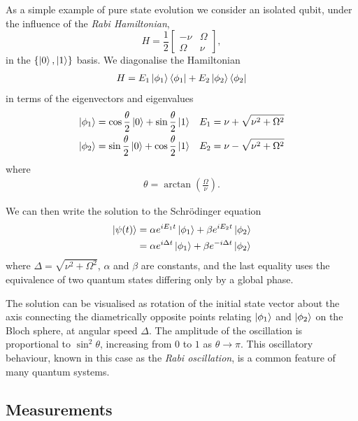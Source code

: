 As a simple example of pure state evolution we consider an isolated qubit, under the influence of the \textit{Rabi Hamiltonian},
\begin{equation} \label{rabi_hamiltonian}
  H = \frac{1}{2}
\begin{bmatrix}
  -\nu & \Omega \\
  \Omega & \nu 
\end{bmatrix},
\end{equation}
in the $\{\left\vert0\right\rangle, \left\vert1\right\rangle\}$ basis. We diagonalise the Hamiltonian
\begin{align}
  H = E_1 \left\vert\phi_1\right\rangle\left\langle \phi_1\right\vert + E_2 \left\vert\phi_2\right\rangle\left\langle \phi_2\right\vert
\end{align}
in terms of the eigenvectors and eigenvalues
\begin{align}
  \left\vert\phi_1\right\rangle &=  \cos\frac{\theta}{2}\left\vert0\right\rangle + \sin\frac{\theta}{2}\left\vert1\right\rangle  &E_1 = \nu + \sqrt{\nu^2 + \Omega^2} \\
  \left\vert\phi_2\right\rangle &=  \sin\frac{\theta}{2}\left\vert0\right\rangle + \cos\frac{\theta}{2}\left\vert1\right\rangle &E_2 = \nu - \sqrt{\nu^2 + \Omega^2} 
\end{align}
where
\begin{align}
  \theta = \arctan\left(\frac{\Omega}{\nu}\right).
\end{align}

We can then write the solution to the Schr\"odinger equation
\begin{align}
  \left\vert\psi(t)\right\rangle &= \alpha e^{iE_1t}\left\vert\phi_1\right\rangle +  \beta e^{iE_2t} \left\vert\phi_2\right\rangle \\
  &= \alpha e^{i\Delta t}\left\vert\phi_1\right\rangle +  \beta e^{- i\Delta t} \left\vert\phi_2\right\rangle 
\end{align}
where $\Delta = \sqrt{\nu^2 + \Omega^2}$, $\alpha$ and $\beta$ are constants, and the last equality uses the equivalence of two quantum states differing only by a global phase. 

The solution can be visualised as rotation of the initial state vector about the axis connecting the diametrically opposite points relating $\left\vert\phi_1\right\rangle$ and $\left\vert\phi_2\right\rangle$ on the Bloch sphere, at angular speed $\Delta$. The amplitude of the oscillation is proportional to $\sin^2\theta$, increasing from $0$ to $1$ as $\theta \rightarrow \pi$.  This oscillatory behaviour, known in this case as the \textit{Rabi oscillation}, is a common feature of many quantum systems.

\subsection{Measurements}

